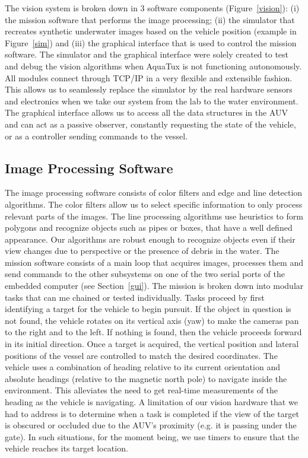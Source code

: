The vision system is broken down in 3
software components (Figure~\ref{vision}): (i) the mission software that performs the image
processing; (ii) the simulator that recreates synthetic underwater
images based on the vehicle position (example in
Figure~\ref{sim}) and (iii) the graphical interface that is used to
control the mission software. The simulator and the graphical
interface were solely created to test and debug the vision
algorithms when AquaTux is not functioning autonomously. All modules connect through TCP/IP in a
very flexible and extensible fashion. This allows us to seamlessly
replace the simulator by the real hardware sensors and electronics
when we take our system from the lab to the water environment. The
graphical interface allows us to access all the data structures in the
AUV and can act as a passive observer, constantly requesting the
state of the vehicle, or as a controller sending commands to the
vessel.



\vspace{-.1in}
\subsection{Image Processing Software}
The image processing software consists of color filters and edge and
line detection algorithms. The color filters allow us to select
specific information to only process relevant parts of the images. The
line processing algorithms use heuristics to form polygons and
recognize objects such as pipes or boxes, that have a well defined
appearance. Our algorithms are robust enough to recognize objects even
if their view changes due to perspective or the presence of debris in
the water.  The mission software consists of a main loop that acquires
images, processes them and send commands to the other subsystems on
one of the two serial ports of the embedded computer (see
Section~\ref{gui}). The mission is broken down into modular tasks that
can me chained or tested individually. Tasks proceed by first
identifying a target for the vehicle to begin pursuit. If the object
in question is not found, the vehicle rotates on its vertical axis
(yaw) to make the cameras pan to the right and to the left. If nothing
is found, then the vehicle proceeds forward in its initial direction.
Once a target is acquired, the vertical position and lateral positions
of the vessel are controlled to match the desired coordinates.  The
vehicle uses a combination of heading relative to its current
orientation and absolute headings (relative to the magnetic north
pole) to navigate inside the environment. This alleviates the need to
get real-time measurements of the heading as the vehicle is
navigating. A limitation of our vision hardware that we had to address
is to determine when a task is completed if the view of the target is
obscured or occluded due to the AUV's proximity (e.g. it is passing
under the gate). In such situations, for the moment being, we use
timers to ensure that the vehicle reaches its target location.
